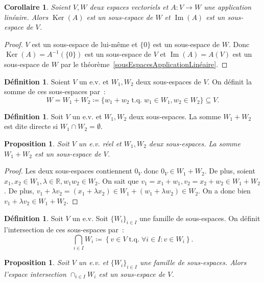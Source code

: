 \documentclass{article}
\DeclareMathOperator{\tq}{\text{ t.q. }}
\DeclareMathOperator{\Ker}{Ker}
\DeclareMathOperator{\Imf}{Im}
\newcommand{\R}{\mathbb R}
\newtheorem{prp}[thm]{Proposition}
\newtheorem{cor}[thm]{Corollaire}
\theoremstyle{definition}
\newtheorem{déf}[thm]{Définition}
\theoremstyle{remark}
\begin{document}
		\begin{cor} Soient $V, W$ deux espaces vectoriels et $A : V \to W$ une application linéaire. Alors $\Ker(A)$ est un sous-espace de $W$ et $\Imf(A)$ est un
		sous-espace de $V$. \end{cor}

		\begin{proof} $V$ est un sous-espace de lui-même et $\{0\}$ est un sous-espace de $W$. Donc $\Ker(A) = A^{-1}(\{0\})$ est un sous-espace de $V$ et
		$\Imf(A) = A(V)$ est un sous-espace de $W$ par le théorème~\ref{sousEspacesApplicationLinéaire}.\end{proof}

		\begin{déf} Soient $V$ un e.v. et $W_1, W_2$ deux sous-espaces de $V$. On définit la somme de ces sous-espaces par~:
		\[W = W_1 + W_2 \coloneqq \{w_1 + w_2 \tq w_1 \in W_1, w_2 \in W_2\} \subseteq V.\] \end{déf}

		\begin{déf} Soit $V$ un e.v. et $W_1, W_2$ deux sous-espaces. La somme $W_1 + W_2$ est dite directe si $W_1 \cap W_2 = \emptyset$. \end{déf}

		\begin{prp} Soit $V$ un e.v. réel et $W_1, W_2$ deux sous-espaces. La somme $W_1 + W_2$ est un sous-espace de $V$. \end{prp}

		\begin{proof} Les deux sous-espaces contiennent $0_V$ donc $0_V \in W_1+W_2$. De plus, soient $x_1, x_2 \in W_1, \lambda \in \R, w_1 w_2 \in W_2$. On sait que
		$v_1 = x_1 + w_1, v_2 = x_2 + w_2 \in W_1+W_2$. De plus, $v_1 + \lambda v_2 = (x_1 + \lambda x_2) \in W_1 + (w_1 + \lambda w_2) \in W_2$. On a donc bien
		$v_1 + \lambda v_2 \in W_1 + W_2$. \end{proof}

		\begin{déf} Soit $V$ un e.v. Soit $\{W_i\}_{i \in I}$ une famille de sous-espaces. On définit l'intersection de ces sous-espaces par~:
		\[\bigcap_{i \in I}W_i \coloneqq \left\{v \in V \tq \forall i \in I : v \in W_i\right\}.\]\end{déf}

		\begin{prp} Soit $V$ un e.v. et $\{W_i\}_{i \in I}$ une famille de sous-espaces. Alors l'espace intersection $\cap_{i \in I}W_i$ est un sous-espace de $V$.
		\end{prp}
\end{document}
